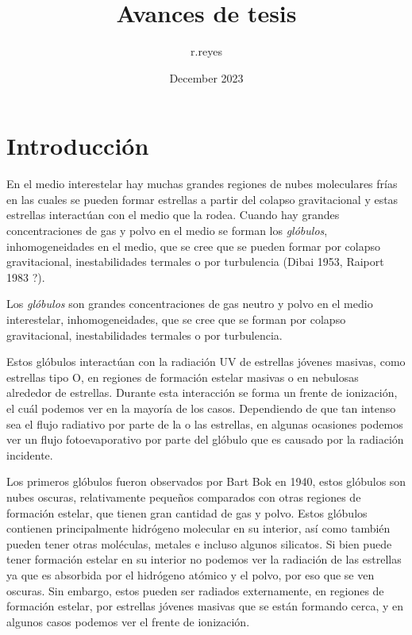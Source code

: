 \documentclass{book}
\title{Avances de tesis}
\author{r.reyes }
\date{December 2023}
\begin{document}
\maketitle

\tableofcontents

\newpage

\chapter{Introducción}

En el medio interestelar hay muchas grandes regiones de nubes moleculares frías en las cuales se pueden formar estrellas a partir del colapso gravitacional y estas estrellas interactúan con el medio que la rodea. Cuando hay grandes concentraciones de gas y polvo en el medio se forman los \textit{glóbulos}, inhomogeneidades en el medio, que se cree que se pueden formar por colapso gravitacional, inestabilidades termales o por turbulencia (Dibai 1953, Raiport 1983 ?). 

Los \textit{glóbulos} son grandes concentraciones de gas neutro y polvo en el medio interestelar, inhomogeneidades, que se cree que se forman por colapso gravitacional, inestabilidades termales o por turbulencia. 

Estos glóbulos interactúan con la radiación UV de estrellas jóvenes masivas, como estrellas tipo O, en regiones de formación estelar masivas o en nebulosas alrededor de estrellas. Durante esta interacción se forma un frente de ionización, el cuál podemos ver en la mayoría de los casos. Dependiendo de que tan intenso sea el flujo radiativo por parte de la o las estrellas, en algunas ocasiones podemos ver un flujo fotoevaporativo por parte del glóbulo que es causado por la radiación incidente.

Los primeros glóbulos fueron observados por Bart Bok en 1940, estos glóbulos son nubes oscuras, relativamente pequeños comparados con otras regiones de formación estelar, que tienen gran cantidad de gas y polvo. Estos glóbulos contienen principalmente hidrógeno molecular en su interior, así como también pueden tener otras moléculas, metales e incluso algunos silicatos. Si bien puede tener formación estelar en su interior no podemos ver la radiación de las estrellas ya que es absorbida por el hidrógeno atómico y el polvo, por eso que se ven oscuras. Sin embargo, estos pueden ser radiados externamente, en regiones de formación estelar, por estrellas jóvenes masivas que se están formando cerca, y en algunos casos podemos ver el frente de ionización.
\end{document}
